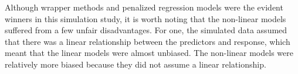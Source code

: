 \documentclass{article}
\begin{document}


Although wrapper methods and penalized regression models were the evident winners in this simulation study, it is worth noting that the non-linear models suffered from a few unfair disadvantages. For one, the simulated data assumed that there was a linear relationship between the predictors and response, which meant that the linear models were almost unbiased. The non-linear models were relatively more biased because they did not assume a linear relationship. 
\end{document}
